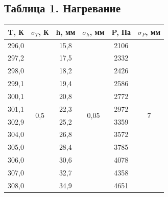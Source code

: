 \documentclass[15pt,a5paper,reqno]{article}
\begin{document}
    \subsection{Таблица 1. Нагревание}
    \begin{tabular}{|c|c|c|c|c|c|}
        \hline
        T, К  &  $\sigma_T$, К        & h, мм & $\sigma_h$, мм         & P, Па & $\sigma_P$, мм      \\ \hline
        296,0 & \multirow{12}{*}{0,5} & 15,8  & \multirow{12}{*}{0,05} & 2106  & \multirow{12}{*}{7} \\ 
        297,2 &                       & 17,5  &                        & 2332  &                     \\ 
        298,0 &                       & 18,2  &                        & 2426  &                     \\ 
        299,1 &                       & 19,4  &                        & 2586  &                     \\ 
        300,1 &                       & 20,8  &                        & 2772  &                     \\ 
        301,1 &                       & 22,3  &                        & 2972  &                     \\ 
        302,9 &                       & 25,2  &                        & 3359  &                     \\ 
        304,0 &                       & 26,8  &                        & 3572  &                     \\         
        305,0 &                       & 28,4  &                        & 3785  &                     \\         
        306,0 &                       & 30,6  &                        & 4078  &                     \\        
        307,0 &                       & 32,7  &                        & 4358  &                     \\       
        308,0 &                       & 34,9  &                        & 4651  &                     \\ \hline
    \end{tabular}
    
\end{document}
